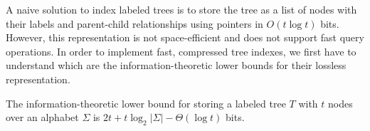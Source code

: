A naive solution to index labeled trees is to store the tree as a list of nodes with their labels and parent-child relationships using pointers in $O(t \log t)$ bits. However, this representation is not space-efficient and does not support fast query operations.
In order to implement fast, compressed tree indexes, we first have to understand which are the information-theoretic lower bounds for their lossless representation.

\begin{comment}
    \section{Succinct Data Structures for Trees}
    \alessio{Questa sezione non è ben collegata al resto. Serve questa parentesi sulle SDS? Dato che anche prima parli di minimizzare lo spazio e time optimality, potresti parlare direttamente dei lower bound. Il filo logico sarebbe: "vogliamo fare le cose il meglio possibile, ma quanto vale il meglio?"}
    In order to compress the index of labeled trees, we need to avoid the use of pointers and store the tree in a space-efficient manner. Succinct data structures are a class of compressed data structures that support efficient navigation and query operations on the compressed data. These structures are designed to use close to the information-theoretic lower bound on space while providing fast access to the original data. They were first introduced by Jacobson \cite{jacobson1989space} and have been applied to various problems in string processing, graph theory, and data compression.
\end{comment}


\begin{lemma} \label{lem:info_theoretic_lower_bound}
The information-theoretic lower bound for storing a labeled tree $T$ with $t$ nodes over an alphabet $\Sigma$ is $2t + t \log_2 |\Sigma| - \Theta(\log t)$ bits.
\end{lemma}

